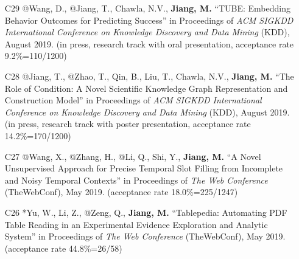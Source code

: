 \documentclass[10pt]{article}
\newenvironment{myindentpar}[1]%
{\begin{list}{}%
         {\setlength{\leftmargin}{#1}}%
         \item[]%
}
{\end{list}}
\newcounter{list}
\begin{document}
\begin{myindentpar}{0.00cm}
\begin{enumerate}[leftmargin=.5cm]
\item[C29] @Wang, D., @Jiang, T., Chawla, N.V., \textbf{Jiang, M.} ``TUBE: Embedding Behavior Outcomes for Predicting Success'' in Proceedings of \emph{ACM SIGKDD International Conference on Knowledge Discovery and Data Mining} (KDD), August 2019. (in press, research track with oral presentation, acceptance rate 9.2\%=110/1200)

\vspace{-0.1cm}

\item[C28] @Jiang, T., @Zhao, T., Qin, B., Liu, T., Chawla, N.V., \textbf{Jiang, M.} ``The Role of Condition: A Novel Scientific Knowledge Graph Representation and Construction Model'' in Proceedings of \emph{ACM SIGKDD International Conference on Knowledge Discovery and Data Mining} (KDD), August 2019. (in press, research track with poster presentation, acceptance rate 14.2\%=170/1200)

\vspace{-0.1cm}

\item[C27] @Wang, X., @Zhang, H., @Li, Q., Shi, Y., \textbf{Jiang, M.} ``A Novel Unsupervised Approach for Precise Temporal Slot Filling from Incomplete and Noisy Temporal Contexts'' in Proceedings of \emph{The Web Conference } (TheWebConf), May 2019. (acceptance rate 18.0\%=225/1247)

\vspace{-0.1cm}

\item[C26] *Yu, W., Li, Z., @Zeng, Q., \textbf{Jiang, M.} ``Tablepedia: Automating PDF Table Reading in an Experimental Evidence Exploration and Analytic System'' in Proceedings of \emph{The Web Conference } (TheWebConf), May 2019. (acceptance rate 44.8\%=26/58)


\end{enumerate}
\end{myindentpar}
\end{document}
